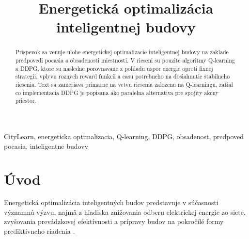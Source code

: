 \documentclass[conference]{IEEEtran}
\begin{document}
\title{Energetická optimalizácia inteligentnej budovy\\
}

\author{
\and
{}
}

\maketitle

\begin{abstract}

Prispevok sa venuje ulohe energetickej optimalizacie inteligentnej budovy na zaklade predpovedi pocasia a obsadenosti miestnosti. V rieseni su pouzite algoritmy Q-learning a DDPG, ktore su nasledne porovnavane z pohladu uspor energie oproti fixnej strategii, vplyvu roznych reward funkcii a casu potrebneho na dosiahnutie stabilneho riesenia. Text sa zameriava primarne na vetvu riesenia zalozenu na Q-learningu, zatial co implementacia DDPG je popisana ako paralelna alternativa pre spojity akcny priestor.

\end{abstract}

\begin{IEEEkeywords}
    
CityLearn, energeticka optimalizacia, Q-learning, DDPG, obsadenost, predpoved pocasia, inteligentne budovy
\end{IEEEkeywords}

\section{Úvod}

Energetická optimalizácia inteligentných budov predstavuje v súčasnosti významnú výzvu, najmä z hľadiska znižovania odberu elektrickej energie zo siete, zvyšovania prevádzkovej efektívnosti a prípravy budov na pokročilé formy prediktívneho riadenia \cite{b1,b15}.
\end{document}
